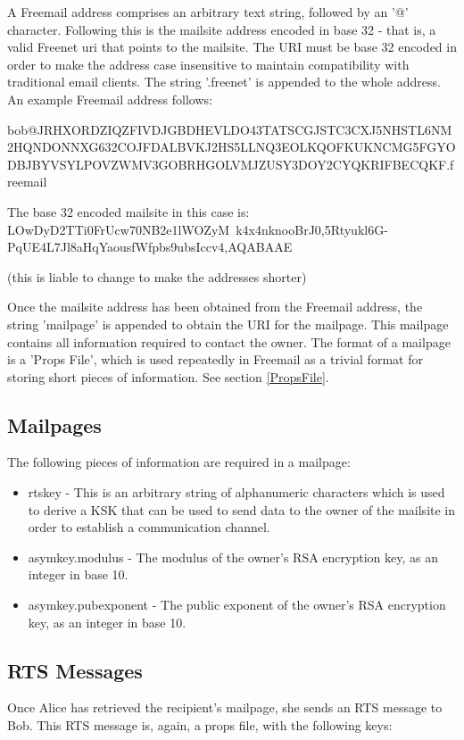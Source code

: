 \documentclass[12pt,a4paper]{article}
\begin{document}
A Freemail address comprises an arbitrary text string, followed by an '@' character. Following this is the mailsite address encoded in base 32 - that is, a valid Freenet uri that points to the mailsite. The URI must be base 32 encoded in order to make the address case insensitive to maintain compatibility with traditional email clients. The string '.freenet' is appended to the whole address. An example Freemail address follows:

bob@JRHXORDZIQZFIVDJ\-GBDHEVLDO43TATSCGJST\-C3CXJ5NHSTL6NM2HQ\-NDONNXG632COJFD\-ALBVKJ2HS5LLNQ3E\-OLKQOFKUKNCMG5F\-GYODBJBY\-VSYLPOVZ\-WMV3GOBRHGOLVMJ\-ZUSY3DOY2CY\-QKRIFBECQKF.freemail

The base 32 encoded mailsite in this case is: LOwDyD2TTi0FrUcw70N\-B2e1lWOZyM~k4x4n\-knooBrJ0,5Rtyu\-kl6G-PqUE4L7\-Jl8aHqYaous\-fWfpbs9ubsI\-ccv4,AQABAAE

(this is liable to change to make the addresses shorter)

Once the mailsite address has been obtained from the Freemail address, the string 'mailpage' is appended to obtain the URI for the mailpage. This mailpage contains all information required to contact the owner. The format of a mailpage is a 'Props File', which is used repeatedly in Freemail as a trivial format for storing short pieces of information. See section \ref{PropsFile}.

\subsection{Mailpages}
The following pieces of information are required in a mailpage:

\begin{itemize}
\item rtskey - This is an arbitrary string of alphanumeric characters which is used to derive a KSK that can be used to send data to the owner of the mailsite in order to establish a communication channel.
\item asymkey.modulus - The modulus of the owner's RSA encryption key, as an integer in base 10.
\item asymkey.pubexponent - The public exponent of the owner's RSA encryption key, as an integer in base 10.
\end{itemize}

\subsection{RTS Messages}
Once Alice has retrieved the recipient's mailpage, she sends an RTS message to Bob. This RTS message is, again, a props file, with the following keys:
\end{document}
